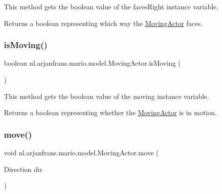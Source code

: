 This method gets the boolean value of the faces\+Right instance variable. 

\begin{DoxyReturn}{Returns}
a boolean representing which way the \hyperlink{classnl_1_1arjanfrans_1_1mario_1_1model_1_1MovingActor}{Moving\+Actor} faces. 
\end{DoxyReturn}
\mbox{\label{classnl_1_1arjanfrans_1_1mario_1_1model_1_1MovingActor_a43e403fe46a10dbac42c1f7800146a9c}} 
\subsubsection{\texorpdfstring{is\+Moving()}{isMoving()}}
{\footnotesize\ttfamily boolean nl.\+arjanfrans.\+mario.\+model.\+Moving\+Actor.\+is\+Moving (\begin{DoxyParamCaption}{ }\end{DoxyParamCaption})}



This method gets the boolean value of the moving instance variable. 

\begin{DoxyReturn}{Returns}
a boolean representing whether the \hyperlink{classnl_1_1arjanfrans_1_1mario_1_1model_1_1MovingActor}{Moving\+Actor} is in motion. 
\end{DoxyReturn}
\mbox{\label{classnl_1_1arjanfrans_1_1mario_1_1model_1_1MovingActor_a0abaf6ff6ce1a5237a268f29e433a5ed}} 
\subsubsection{\texorpdfstring{move()}{move()}}
{\footnotesize\ttfamily void nl.\+arjanfrans.\+mario.\+model.\+Moving\+Actor.\+move (\begin{DoxyParamCaption}\item[{Direction}]{dir }\end{DoxyParamCaption})}



